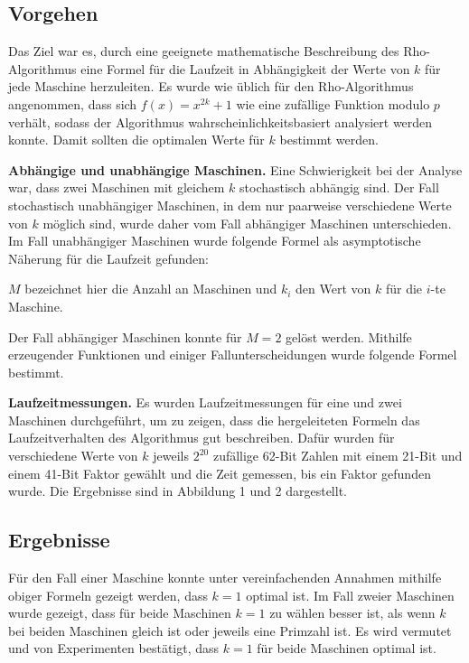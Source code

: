 \documentclass[a4paper, extrafontsizes, ngerman, 25pt]{memoir}
\begin{document}
\newpage

\subsection{Vorgehen}

Das Ziel war es, durch eine geeignete mathematische Beschreibung des Rho-Algorithmus eine Formel für die Laufzeit in Abhängigkeit der Werte von $k$ für jede Maschine herzuleiten. Es wurde wie üblich für den Rho-Algorithmus angenommen, dass sich $f(x) = x^{2k} + 1$ wie eine zufällige Funktion modulo $p$ verhält, sodass der Algorithmus wahrscheinlichkeitsbasiert analysiert werden konnte. Damit sollten die optimalen Werte für $k$ bestimmt werden.

\vspace{0.5cm}
\noindent \textbf{Abhängige und unabhängige Maschinen.} Eine Schwierigkeit bei der Analyse war, dass zwei Maschinen mit gleichem $k$ stochastisch abhängig sind. Der Fall stochastisch unabhängiger Maschinen, in dem nur paarweise verschiedene Werte von $k$ möglich sind, wurde daher vom Fall abhängiger Maschinen unterschieden. Im Fall unabhängiger Maschinen wurde folgende Formel als asymptotische Näherung für die Laufzeit gefunden:

\begin{figure}[H]
    \centering
    
\end{figure}

\noindent $M$ bezeichnet hier die Anzahl an Maschinen und $k_i$ den Wert von $k$ für die $i$-te Maschine.

Der Fall abhängiger Maschinen konnte für $M = 2$ gelöst werden. Mithilfe erzeugender Funktionen und einiger Fallunterscheidungen wurde folgende Formel bestimmt.

\begin{figure}[H]
    \centering
    
\end{figure}

\noindent \textbf{Laufzeitmessungen.} Es wurden Laufzeitmessungen für eine und zwei Maschinen durchgeführt, um zu zeigen, dass die hergeleiteten Formeln das Laufzeitverhalten des Algorithmus gut beschreiben. Dafür wurden für verschiedene Werte von $k$ jeweils $2^{20}$ zufällige 62-Bit Zahlen mit einem 21-Bit und einem 41-Bit Faktor gewählt und die Zeit gemessen, bis ein Faktor gefunden wurde. Die Ergebnisse sind in Abbildung 1 und 2 dargestellt.

\subsection{Ergebnisse}

Für den Fall einer Maschine konnte unter vereinfachenden Annahmen mithilfe obiger Formeln gezeigt werden, dass $k = 1$ optimal ist. Im Fall zweier Maschinen wurde gezeigt, dass für beide Maschinen $k = 1$ zu wählen besser ist, als wenn $k$ bei beiden Maschinen gleich ist oder jeweils eine Primzahl ist. Es wird vermutet und von Experimenten bestätigt, dass $k = 1$ für beide Maschinen optimal ist.
\end{document}
